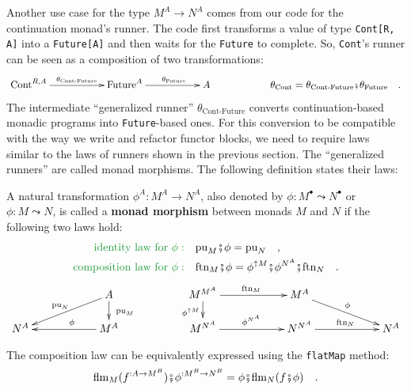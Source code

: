 Another use case for the type $M^{A}\rightarrow N^{A}$ comes from
our code for the continuation monad\textsf{'}s runner. The code first transforms
a value of type \lstinline!Cont[R, A]! into a \lstinline!Future[A]!
and then waits for the \lstinline!Future! to complete. So, \lstinline!Cont!\textsf{'}s
runner can be seen as a composition of two transformations:
\[
\xymatrix{\xyScaleY{0.8pc}\xyScaleX{4.5pc}\text{Cont}^{R,A}\ar[r]\sp(0.5){\theta_{\text{Cont-Future}}} & \text{Future}^{A}\ar[r]\sp(0.6){\theta_{\text{Future}}} & A & \theta_{\text{Cont}}=\theta_{\text{Cont-Future}}\bef\theta_{\text{Future}}\quad.}
\]
The intermediate \textsf{``}generalized runner\textsf{''} $\theta_{\text{Cont-Future}}$
converts continuation-based monadic programs into \lstinline!Future!-based
ones. For this conversion to be compatible with the way we write and
refactor functor blocks, we need to require laws similar to the laws
of runners shown in the previous section. The \textsf{``}generalized runners\textsf{''}
are called monad morphisms. The following definition states their
laws:

A natural transformation $\phi^{A}:M^{A}\rightarrow N^{A}$, also
denoted by $\phi:M^{\bullet}\leadsto N^{\bullet}$ or $\phi:M\leadsto N$,
is called a \textbf{monad morphism} between
monads $M$ and $N$ if the following two laws hold:
\begin{align}
{\color{greenunder}\text{identity law for }\phi:}\quad & \text{pu}_{M}\bef\phi=\text{pu}_{N}\quad,\label{eq:monad-morphism-identity-law}\\
{\color{greenunder}\text{composition law for }\phi:}\quad & \text{ftn}_{M}\bef\phi=\phi^{\uparrow M}\bef\phi^{N^{A}}\bef\text{ftn}_{N}\quad.\label{eq:monad-morphism-composition-law-using-ftn}
\end{align}
\vspace{-1.2\baselineskip}
\[
\xymatrix{\xyScaleY{1.2pc}\xyScaleX{4.8pc} & A\ar[d]\sp(0.5){\ \text{pu}_{M}\ }\ar[ld]\sb(0.5){\text{pu}_{N}} & M^{M^{A}}\ar[d]\sb(0.5){\phi^{\uparrow M}}\ar[r]\sp(0.5){\text{ftn}_{M}} & M^{A}\ar[rd]\sp(0.5){\phi}\\
N^{A} & M^{A}\ar[l]\sb(0.42){\phi} & M^{N^{A}}\ar[r]\sp(0.5){\phi^{N^{A}}} & N^{N^{A}}\ar[r]\sp(0.5){\text{ftn}_{N}} & N^{A}
}
\]

The composition law can be equivalently expressed using the \lstinline!flatMap!
method:
\begin{equation}
\text{flm}_{M}(f^{:A\rightarrow M^{B}})\bef\phi^{:M^{B}\rightarrow N^{B}}=\phi\bef\text{flm}_{N}(f\bef\phi)\quad.\label{eq:monad-morphism-composition-law-using-flatMap}
\end{equation}

